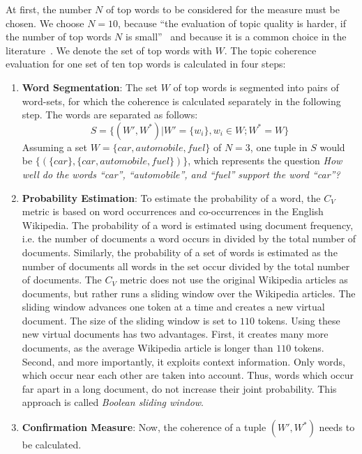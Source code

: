 \documentclass[
        a4paper,
        titlepage,
        twoside,
        parskip
        ]{scrbook}
\theoremstyle{break}
\begin{document}
At first, the number $N$ of top words to be considered for the measure must be chosen.
We choose $N=10$, because ``the evaluation of topic quality is harder, if the number of top words $N$ is small''~\cite{Roder2015} and because it is a common choice in the literature~\cite{Roder2015,Aletras2013}.
We denote the set of top words with $W$.
The topic coherence evaluation for one set of ten top words is calculated in four steps:
\begin{enumerate}
  \item \textbf{Word Segmentation}:
    The set $W$ of top words is segmented into pairs of word-sets, for which the coherence is calculated separately in the following step.
    The words are separated as follows:
    \begin{equation*}
      S = \{ (W', W^*) | W' = \{w_i\}, w_i \in W; W^* = W \}
    \end{equation*}
    Assuming a set $W = \{ car, automobile, fuel \}$ of $N = 3$, one tuple in $S$ would be $\{ (\{car\}, \{car, automobile, fuel\})\}$, which represents the question \emph{How well do the words ``car'', ``automobile'', and ``fuel'' support the word ``car''?}
  \item \textbf{Probability Estimation}:
    To estimate the probability of a word, the $C_V$ metric is based on word occurrences and co-occurrences in the English Wikipedia.
    The probability of a word is estimated using document frequency, i.e. the number of documents a word occurs in divided by the total number of documents.
    Similarly, the probability of a set of words is estimated as the number of documents all words in the set occur divided by the total number of documents.
    The $C_V$ metric does not use the original Wikipedia articles as documents, but rather runs a sliding window over the Wikipedia articles.
    The sliding window advances one token at a time and creates a new virtual document.
    The size of the sliding window is set to $110$ tokens.
    Using these new virtual documents has two advantages.
    First, it creates many more documents, as the average Wikipedia article is longer than $110$ tokens.
    Second, and more importantly, it exploits context information.
    Only words, which occur near each other are taken into account.
    Thus, words which occur far apart in a long document, do not increase their joint probability.
    This approach is called \emph{Boolean sliding window}.
  \item \textbf{Confirmation Measure}:
    Now, the coherence of a tuple $(W', W^*)$ needs to be calculated.

\end{enumerate}
\end{document}
